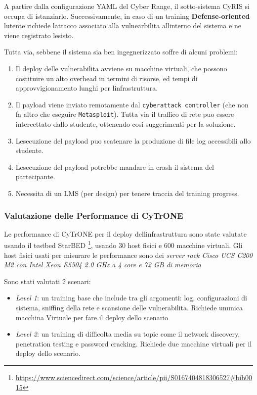 A partire dalla configurazione YAML del Cyber Range, il sotto-sistema
CyRIS si occupa di istanziarlo. Successivamente, in caso di un training
\textbf{Defense-oriented} l\textquotesingle utente richiede
l\textquotesingle attacco associato alla vulnearbilita
all\textquotesingle interno del sistema e ne viene registrato
l\textquotesingle esisto.

Tutta via, sebbene il sistema sia ben ingegnerizzato soffre di alcuni
problemi:

\begin{enumerate}
\def\labelenumi{\arabic{enumi}.}
\tightlist
\item
  Il deploy delle vulnerabilita avviene su macchine virtuali, che
  possono costituire un alto overhead in termini di risorse, ed tempi di
  approvvigionamento lunghi per l\textquotesingle infrastruttura.
\item
  Il payload viene inviato remotamente dal
  \passthrough{\lstinline!cyberattack controller!} (che non fa altro che
  eseguire \passthrough{\lstinline!Metasploit!}). Tutta via il traffico
  di rete puo\textquotesingle{} essere intercettato dallo studente,
  ottenendo cosi suggerimenti per la soluzione.
\item
  L\textquotesingle esecuzione del payload puo scatenare la produzione
  di file log accessibili allo studente.
\item
  L\textquotesingle esecuzione del payload potrebbe mandare in crash il
  sistema del partecipante.
\item
  Necessita di un LMS (per design) per tenere traccia del training
  progress.
\end{enumerate}

\subsubsection{Valutazione delle Performance di
CyTrONE}\label{valutazione-delle-performance-di-cytrone}

Le performance di CyTrONE per il deploy
dell\textquotesingle infrastruttura sono state valutate usando il
testbed StarBED \footnote{\label{fn:ref_12}\url{https://www.sciencedirect.com/science/article/pii/S0167404818306527\#bib0015}},
usando 30 host fisici e 600 macchine virtuali. Gli host fisici usati per
misurare le performance sono dei \emph{server rack Cisco UCS C200 M2 con
Intel Xeon E5504 2.0 GHz a 4 core e 72 GB di memoria}

Sono stati valutati 2 scenari:

\begin{itemize}
\tightlist
\item
  \emph{Level 1}: un training base che include tra gli argomenti: log,
  configurazioni di sistema, sniffing della rete e scansione delle
  vulnerabilita. Richiede un\textquotesingle unica macchina Virtuale per
  fare il deploy dello scenario
\item
  \emph{Level 2}: un training di difficolta media su topic come il
  network discovery, penetration testing e password cracking. Richiede
  due macchine virtuali per il deploy dello scenario.
\end{itemize}

